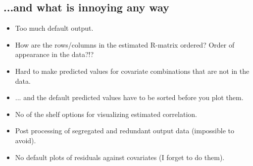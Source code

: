 \documentclass[a4paper,10pt]{article}
\begin{document}
\subsection*{...and what is innoying any way}
\begin{itemize}
\item Too much default output.
\item How are the rows/columns in the estimated R-matrix ordered? Order of appearance in the data?!?
\item Hard to make predicted values for covariate combinations that are not in the data.
\item ... and the default predicted values have to be sorted before you plot them.
\item No of the shelf options for visualizing estimated correlation.
\item Post processing of segregated and redundant output data (impossible to avoid).
\item No default plots of residuals against covariates (I forget to do them).
\end{itemize}
\end{document}
